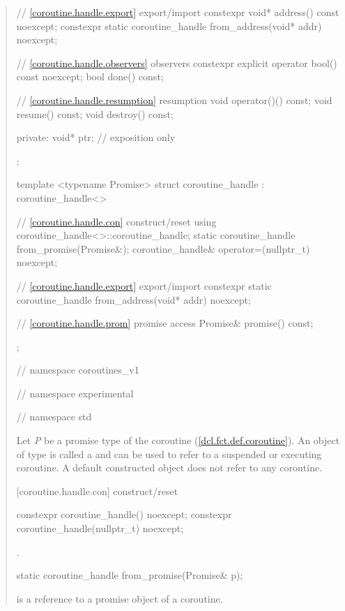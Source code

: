 \begin{quote}
\begin{codeblock}
{{{{    // \ref{coroutine.handle.export} export/import
    constexpr void* address() const noexcept;
    constexpr static coroutine_handle from_address(void* addr) noexcept;		
    
    // \ref{coroutine.handle.observers} observers
    constexpr explicit operator bool() const noexcept;
    bool done() const; 
    
    // \ref{coroutine.handle.resumption} resumption
    void operator()() const;
    void resume() const;	
    void destroy() const;
    
  private:
    void* ptr; // exposition only
  };

  template <typename Promise>
  struct coroutine_handle : coroutine_handle<>
  {
    // \ref{coroutine.handle.con} construct/reset
    using coroutine_handle<>::coroutine_handle;
    static coroutine_handle from_promise(Promise&);		
    coroutine_handle& operator=(nullptr_t) noexcept;

    // \ref{coroutine.handle.export} export/import
    constexpr static coroutine_handle from_address(void* addr) noexcept;
    
    // \ref{coroutine.handle.prom} promise access
    Promise& promise() const;
  };

} // namespace coroutines_v1
} // namespace experimental
} // namespace std
\end{codeblock}

\pnum
Let \textit{P} be a promise type of the coroutine (\ref{dcl.fct.def.coroutine}). An object of type  is called a 
and can be used to refer to a suspended or executing coroutine.
A default constructed  object does not refer to any coroutine.



[coroutine.handle.con]{ construct/reset}
\begin{itemdecl}
  constexpr coroutine_handle() noexcept;		
  constexpr coroutine_handle(nullptr_t) noexcept;
\end{itemdecl}
\begin{itemdescr}
  \pnum\postconditions {}.
\end{itemdescr}

\begin{itemdecl}
  static coroutine_handle from_promise(Promise& p);
\end{itemdecl}
\begin{itemdescr}
  \pnum
  \precondition {} is a reference to a promise object of a coroutine.
  

\end{itemdescr}
\end{quote}
